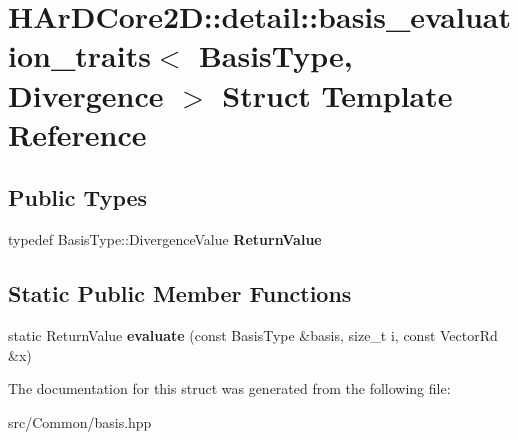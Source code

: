 \hypertarget{structHArDCore2D_1_1detail_1_1basis__evaluation__traits_3_01BasisType_00_01Divergence_01_4}{}\section{H\+Ar\+D\+Core2D\+:\+:detail\+:\+:basis\+\_\+evaluation\+\_\+traits$<$ Basis\+Type, Divergence $>$ Struct Template Reference}
\label{structHArDCore2D_1_1detail_1_1basis__evaluation__traits_3_01BasisType_00_01Divergence_01_4}
\subsection*{Public Types}
\begin{DoxyCompactItemize}
\item 
\mbox{\label{structHArDCore2D_1_1detail_1_1basis__evaluation__traits_3_01BasisType_00_01Divergence_01_4_a629fb65115831ee4fec373cac0698337}} 
typedef Basis\+Type\+::\+Divergence\+Value {\bfseries Return\+Value}
\end{DoxyCompactItemize}
\subsection*{Static Public Member Functions}
\begin{DoxyCompactItemize}
\item 
\mbox{\label{structHArDCore2D_1_1detail_1_1basis__evaluation__traits_3_01BasisType_00_01Divergence_01_4_acbc363ebd4854186c0ed682d098158bc}} 
static Return\+Value {\bfseries evaluate} (const Basis\+Type \&basis, size\+\_\+t i, const Vector\+Rd \&x)
\end{DoxyCompactItemize}


The documentation for this struct was generated from the following file\+:\begin{DoxyCompactItemize}
\item 
src/\+Common/basis.\+hpp\end{DoxyCompactItemize}
